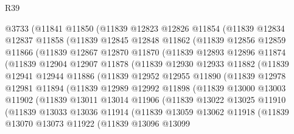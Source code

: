 \begin{lexlean}{R39}
\begin{coremodule}
    @3733
      (@11841
        @11850
        (@11839
          @12823
          @12826
          @11854
          (@11839
            @12834
            @12837
            @11858
            (@11839
              @12845
              @12848
              @11862
              (@11839
                @12856
                @12859
                @11866
                (@11839
                  @12867
                  @12870
                  @11870
                  (@11839
                    @12893
                    @12896
                    @11874
                    (@11839
                      @12904
                      @12907
                      @11878
                      (@11839
                        @12930
                        @12933
                        @11882
                        (@11839
                          @12941
                          @12944
                          @11886
                          (@11839
                            @12952
                            @12955
                            @11890
                            (@11839
                              @12978
                              @12981
                              @11894
                              (@11839
                                @12989
                                @12992
                                @11898
                                (@11839
                                  @13000
                                  @13003
                                  @11902
                                  (@11839
                                    @13011
                                    @13014
                                    @11906
                                    (@11839
                                      @13022
                                      @13025
                                      @11910
                                      (@11839
                                        @13033
                                        @13036
                                        @11914
                                        (@11839
                                          @13059
                                          @13062
                                          @11918
                                          (@11839
                                            @13070
                                            @13073
                                            @11922
                                            (@11839
                                              @13096
                                              @13099

\end{coremodule}
\end{lexlean}
